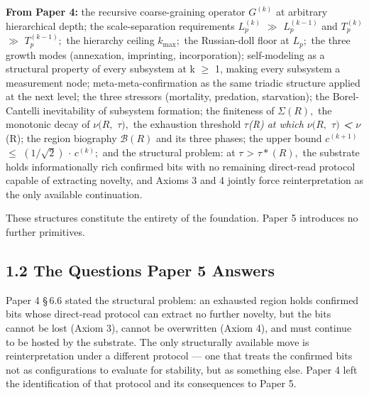 \documentclass[11pt,oneside]{report}
\theoremstyle{definition}
\theoremstyle{remark}
\begin{document}
\textbf{From Paper 4:} the recursive coarse-graining operator \ensuremath{G^{(k)}}
at arbitrary hierarchical depth; the scale-separation requirements
\ensuremath{L_{p}^{(k)}} \ensuremath{\gg} \ensuremath{L_{p}^{(k-1)}} and \ensuremath{T_{p}^{(k)}} \ensuremath{\gg} \ensuremath{T_{p}^{(k-1)};} the
hierarchy ceiling \ensuremath{k_{\mathrm{max}};} the Russian-doll floor at \ensuremath{L_{p};} the three
growth modes (annexation, imprinting, incorporation); self-modeling as a
structural property of every subsystem at k \ensuremath{\geq} 1, making every subsystem
a measurement node; meta-meta-confirmation as the same triadic structure
applied at the next level; the three stressors (mortality, predation,
starvation); the Borel-Cantelli inevitability of subsystem formation;
the finiteness of \ensuremath{\Sigma (R),} the monotonic decay of \ensuremath{\nu (R,} \ensuremath{\tau ),} the exhaustion
threshold \ensuremath{\tau}\emph{(R) at which \ensuremath{\nu (R,} \ensuremath{\tau )} \textbf{\textless{}} \ensuremath{\nu}}(R); the
region biography \ensuremath{\mathcal{B}(R)} and its three phases; the upper bound \ensuremath{c^{(k+1)}} \ensuremath{\leq}
\ensuremath{(1/\sqrt{2})} \ensuremath{\cdot} \ensuremath{c^{(k)};} and the structural problem: at \ensuremath{\tau} \textgreater{}
\ensuremath{\tau *(R),} the substrate holds informationally rich confirmed bits with no
remaining direct-read protocol capable of extracting novelty, and Axioms
3 and 4 jointly force reinterpretation as the only available
continuation.

These structures constitute the entirety of the foundation. Paper 5
introduces no further primitives.

\subsection*{1.2 The Questions Paper 5 Answers}

Paper 4 \S\,6.6 stated the structural problem: an exhausted region holds
confirmed bits whose direct-read protocol can extract no further
novelty, but the bits cannot be lost (Axiom 3), cannot be overwritten
(Axiom 4), and must continue to be hosted by the substrate. The only
structurally available move is reinterpretation under a different
protocol --- one that treats the confirmed bits not as configurations to
evaluate for stability, but as something else. Paper 4 left the
identification of that protocol and its consequences to Paper 5.
\end{document}
